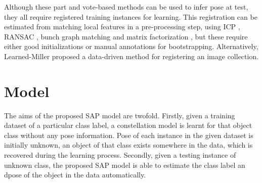 Although these part and vote-based methods can be used to infer pose at test, they all require registered training instances for learning.  
This registration can be estimated from matching local features in a pre-processing step, using ICP \cite{Pham2011}, RANSAC \cite{Moreels2007}, bunch graph matching \cite{Wiskott1997} and matrix factorization \cite{Arie-Nachimson2009}, but these require either good initializations or manual annotations for bootstrapping. Alternatively, Learned-Miller \cite{Learned-Miller2006} proposed a data-driven method for registering an image collection.  





\section{Model}
\label{sec/reg/framework}

The aims of the proposed SAP model are twofold. 
Firstly, given a training dataset of a particular class label, a constellation model is learnt for that object class without any pose information. Pose of each instance in the given dataset is initially unknown, \ie an object of that class exists somewhere in the data, which is recovered during the learning process.
Secondly, given a testing instance of unknown class, the proposed SAP model is able to estimate the class label an dpose of the object in the data automatically. 

